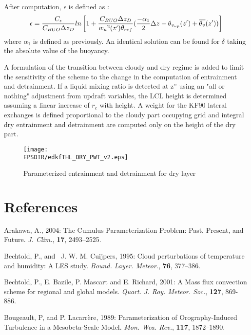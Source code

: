 After computation, $\epsilon$ is defined as :
\begin{equation}
   \epsilon=\frac{C_{\epsilon}}{C_{BUO}\Delta z_D} ln\left[ 1+\frac{C_{BUO}\Delta z_D}{{w_u}^2(z')\theta_{ref}} (\frac{- \alpha_1}{2} \Delta z - \theta_{v_{up}}(z') +  \overline{\theta_v}(z'))\right]\\
   \label{eq:epsilon}
\end{equation}
where $\alpha_1$ is defined as previously. An identical solution can be found for $\delta$ taking the absolute value of the buoyancy.

A formulation of the transition between cloudy and dry regime is added to limit the sensitivity of the scheme to the change in the computation of entrainment and detrainment. If a liquid mixing ratio is detected at z'' using an "all or nothing" adjustment from updraft variables, the LCL height is determined assuming a linear increase of $r_c$ with height. A weight for the KF90 lateral exchanges is defined proportional to the cloudy part occupying grid and integral dry entrainment and detrainment are computed only on the height of the dry part.

\begin{figure}
  \begin{center}
    \texttt{[image: \\EPSDIR/edkfTHL\_DRY\_PWT\_v2.eps]}
  \end{center}
  \caption{Parameterized entrainment and detrainment for dry layer}
  \label{fig:SchemeDes2}
\end{figure}

\section{References}

\noindent \por
Arakawa, A., 2004: 
The Cumulus Parameterization Problem: Past, Present, and Future.
{\it J. Clim.}, {\bf 17}, 2493--2525.

\noindent \por
Bechtold, P., and~ J. W. M. Cuijpers, 1995:
Cloud perturbations of temperature and humidity: A LES study.
{\it Bound. Layer. Meteor.}, {\bf 76}, 377--386.

\noindent \por
Bechtold, P., E. Bazile, P. Mascart and E. Richard, 2001:
A Mass flux convection scheme for regional and global models.
{\it Quart. J. Roy. Meteor. Soc.}, {\bf 127}, 869-886.

\noindent \por
Bougeault, P, and P. Lacarr\`ere, 1989: Parameterization of Orography-Induced
  Turbulence in a Mesobeta-Scale Model.
{\it Mon. Wea. Rev.}, {\bf 117}, 1872--1890.

